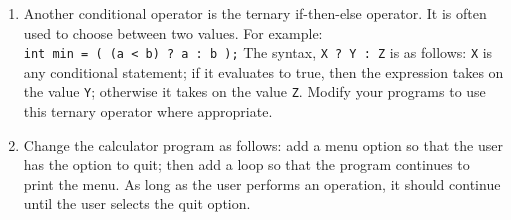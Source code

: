 \documentclass[12pt]{scrartcl}
\begin{document}
\begin{enumerate}
  \item Another conditional operator is the ternary if-then-else operator.  
  	It is often used to choose between two values.  For example:\\	
	\texttt{int min = ( (a < b) ? a : b );}
	The syntax, \texttt{X ? Y : Z} is as follows: \texttt{X} 
	is any conditional statement; if it evaluates to true, then the 
	expression takes on the value \texttt{Y}; otherwise it takes 
	on the value \texttt{Z}.  Modify your programs to use this 
	ternary operator where appropriate.
  \item Change the calculator program as follows: add a menu option 
	so that the user has the option to quit; then add a loop so that 
	the program continues to print the menu.  As long as the user 
	performs an operation, it should continue until the user selects 
	the quit option.
\end{enumerate}
\end{document}
